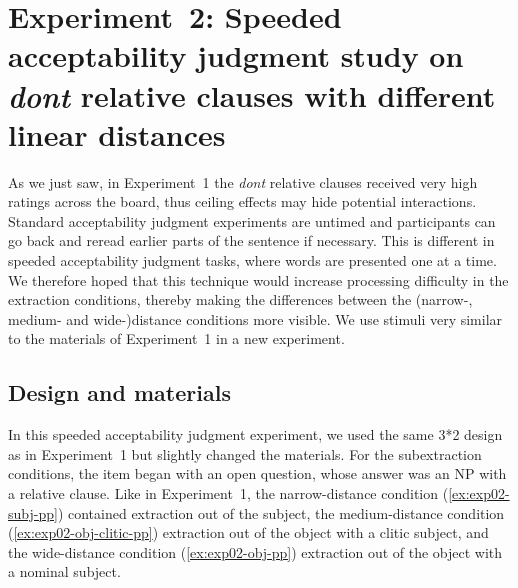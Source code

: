 \section[head=Experiment~2]{Experiment~2: Speeded acceptability judgment study on \emph{dont} relative clauses with different linear distances}
\label{ch:exp02}

As we just saw, in Experiment~1 the \emph{dont} relative clauses received very high ratings across the board, thus ceiling effects may hide potential interactions. Standard acceptability judgment experiments are untimed and participants can go back and reread earlier parts of the sentence if necessary. This is different in speeded acceptability judgment tasks, where words are presented one at a time. We therefore hoped that this technique would increase processing difficulty in the extraction conditions, thereby making the differences between the (narrow-, medium- and wide-)distance conditions more visible. 
We use stimuli very similar to the materials of Experiment~1 in a new experiment.

\subsection{Design and materials}

In this speeded acceptability judgment experiment, we used the same 3*2 design as in Experiment~1 but slightly changed the materials. For the subextraction conditions, the item began with an open question, whose answer was an NP with a relative clause. Like in Experiment~1, the narrow-distance condition (\ref{ex:exp02-subj-pp}) contained extraction out of the subject, the medium-distance condition (\ref{ex:exp02-obj-clitic-pp}) extraction out of the object with a clitic subject, and the wide-distance condition (\ref{ex:exp02-obj-pp}) extraction out of the object with a nominal subject.

